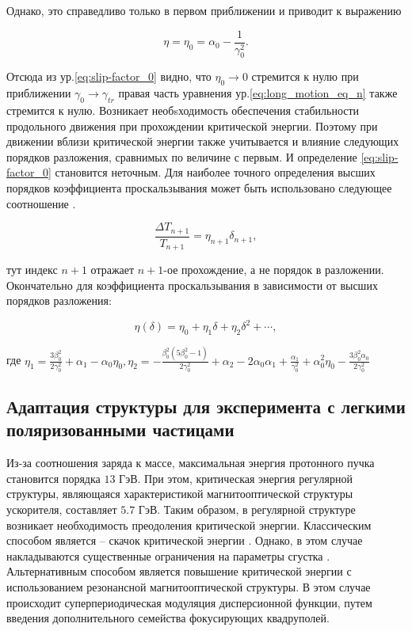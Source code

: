 \noindent Однако, это справедливо только в первом приближении и приводит к выражению

\begin{equation}
\eta = \eta_{0} = \alpha_{0} - \frac{1}{\gamma_{0}^2}.
\label{eq:slip-factor_0}
\end{equation}

\noindent Отсюда из ур.\ref{eq:slip-factor_0} видно, что $\eta_{0}\rightarrow 0$ стремится к нулю при приближении $\gamma_{0}\rightarrow\gamma_{tr}$ правая часть уравнения ур.\ref{eq:long_motion_eq_n} также стремится к нулю. Возникает необsходимость обеспечения стабильности продольного движения при прохождении критической энергии. Поэтому при движении вблизи критической энергии также учитывается и влияние следующих порядков разложения, сравнимых по величине с первым. И определение \ref{eq:slip-factor_0} становится неточным. Для наиболее точного определения высших порядков коэффициента проскальзывания может быть использовано следующее соотношение \cite{ng}.

\begin{equation}
\frac{\Delta T_{n+1}}{T_{n+1}}=\eta_{n+1} \delta_{n+1},
\end{equation}

\noindent тут индекс $n+1$ отражает $n+1$-ое прохождение, а не порядок в разложении. Окончательно для коэффициента проскальзывания в зависимости от высших порядков разложения:

\begin{equation}
\eta(\delta)=\eta_0+\eta_1 \delta+\eta_2 \delta^2+\cdots,
\label{eq:eta}
\end{equation}

\noindent где $\eta_1=\frac{3\beta_0^2}{2\gamma_0^2}+\alpha_1-\alpha_0\eta_0, \eta_2=-\frac{\beta_0^2\left(5 \beta_0^2-1\right)}{2 \gamma_0^2}+\alpha_2-2 \alpha_0 \alpha_1+\frac{\alpha_1}{\gamma_0^2}+\alpha_0^2 \eta_0-\frac{3 \beta_0^2 \alpha_0}{2 \gamma_0^2}$

\subsection{Адаптация структуры для эксперимента с легкими поляризованными частицами}\label{sec:ch:ions_light/transition/energy}

\par Из-за соотношения заряда к массе, максимальная энергия протонного пучка становится порядка $13$ ГэВ. При этом, критическая энергия регулярной структуры, являющаяся характеристикой магнитооптической структуры ускорителя, составляет $5.7$ ГэВ. Таким образом, в регулярной структуре возникает необходимость преодоления критической энергии. Классическим способом является – скачок критической энергии \cite{Kolokolchikov:2024_bb_rupac}. Однако, в этом случае накладываются существенные ограничения на параметры сгустка \cite{Kolokolchikov:2024_bb_dspin}. Альтернативным способом является повышение критической энергии с использованием резонансной магнитооптической структуры. В этом случае происходит суперпериодическая модуляция дисперсионной функции, путем введения дополнительного семейства фокусирующих квадруполей.

